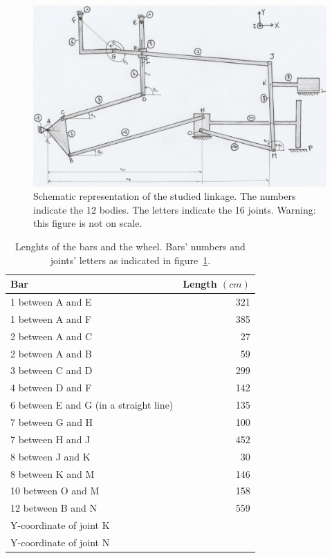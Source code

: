 \documentclass[a4paper]{article}
\begin{document}
\begin{figure}
	\includegraphics[width=\textwidth]{schematic.jpg}
	\centering
	\caption{Schematic representation of the studied linkage. The numbers indicate the 12 bodies. The letters indicate the 16 joints. Warning: this figure is not on scale.}
	\label{fig:schematic}
\end{figure}

\begin{table}[t]
	\centering
	\begin{tabular}{lr}
		\hline
		Bar & Length \((\si{cm})\) \\
		\hline
		1 between A and E & 321 \\
		1 between A and F & 385 \\
		2 between A and C & 27 \\
		2 between A and B & 59 \\
		3 between C and D & 299 \\
		4 between D and F & 142 \\
		6 between E and G (in a straight line) & 135 \\
		7 between G and H & 100 \\
		7 between H and J & 452 \\
		8 between J and K & 30 \\
		8 between K and M & 146 \\
		10 between O and M & 158 \\
		12 between B and N & 559 \\
		Y-coordinate of joint K \footnotemark & \\
		Y-coordinate of joint N \footnotemark & \\
		\hline
	\end{tabular}
	\caption{Lenghts of the bars and the wheel. Bars' numbers and joints' letters as indicated in figure~\ref{fig:schematic}.}
	\label{tab:lengths}
\end{table}
\end{document}
